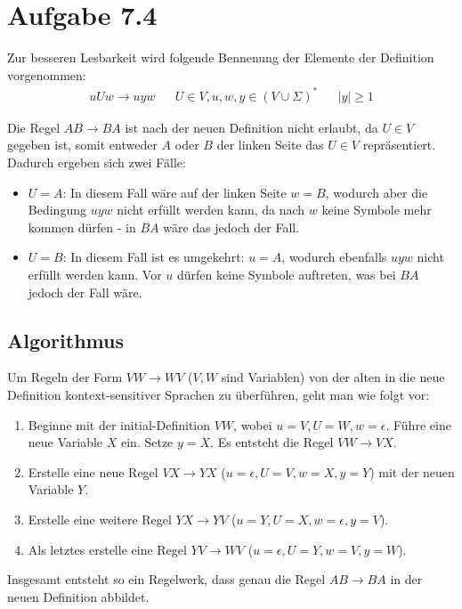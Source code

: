 \documentclass{article}
\begin{document}
\section*{Aufgabe 7.4}
Zur besseren Lesbarkeit wird folgende Bennenung der Elemente der Definition vorgenommen:
\begin{align*}
uUw \rightarrow uyw && U \in V, u,w,y \in \left( V \cup \Sigma \right)^* && |y| \geq 1
\end{align*}

Die Regel $AB\rightarrow BA$ ist nach der neuen Definition nicht erlaubt, da $U \in V$ gegeben ist, somit entweder $A$ oder $B$ der linken Seite das $U \in V$ repräsentiert. Dadurch ergeben sich zwei Fälle:
\begin{itemize}
	\item $U = A$: In diesem Fall wäre auf der linken Seite $w = B$, wodurch aber die Bedingung $uyw$ nicht erfüllt werden kann, da nach $w$ keine Symbole mehr kommen dürfen - in $BA$ wäre das jedoch der Fall.
  \item $U = B$: In diesem Fall ist es umgekehrt: $u = A$, wodurch ebenfalls $uyw$ nicht erfüllt werden kann. Vor $u$ dürfen keine Symbole auftreten, was bei $BA$ jedoch der Fall wäre.
\end{itemize}

\subsection*{Algorithmus}
Um Regeln der Form $VW \rightarrow WV$ ($V, W$ sind Variablen) von der alten in die neue Definition kontext-sensitiver Sprachen zu überführen, geht man wie folgt vor:

\begin{enumerate}
	\item Beginne mit der initial-Definition $VW$, wobei $u=V, U=W, w=\epsilon$. Führe eine neue Variable $X$ ein. Setze $y=X$. Es entsteht die Regel $VW \rightarrow VX$.
  \item Erstelle eine neue Regel $VX \rightarrow YX$ ($u=\epsilon, U=V, w=X, y=Y$) mit der neuen Variable $Y$. 
  \item Erstelle eine weitere Regel $YX \rightarrow YV$ ($u=Y, U=X, w=\epsilon, y=V$).
  \item Als letztes erstelle eine Regel $YV \rightarrow WV$ ($u=\epsilon, U=Y, w=V, y=W$).
\end{enumerate}

Insgesamt entsteht so ein Regelwerk, dass genau die Regel $AB \rightarrow BA$ in der neuen Definition abbildet.
\end{document}
